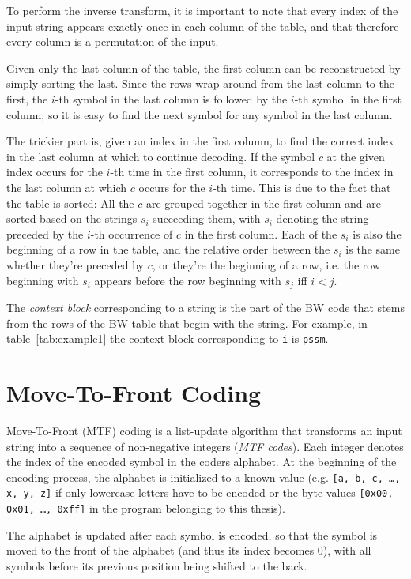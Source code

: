 \documentclass[a4paper]{scrreprt}
\begin{document}
To perform the inverse transform, it is important to note that every index of
the input string appears exactly once in each column of the table, and that
therefore every column is a permutation of the input.

Given only the last column of the table, the first column can be reconstructed
by simply sorting the last. Since the rows wrap around from the last column to
the first, the \(i\)-th symbol in the last column is followed by the \(i\)-th
symbol in the first column, so it is easy to find the next symbol for any
symbol in the last column.

The trickier part is, given an index in the first column, to find the correct
index in the last column at which to continue decoding. If the symbol \(c\)
at the given index occurs for the \(i\)-th time in the first column, it
corresponds to the index in the last column at which \(c\) occurs for the
\(i\)-th time. This is due to the fact that the table is sorted: All the \(c\)
are grouped together in the first column and are sorted based on the strings
\(s_i\) succeeding them, with \(s_i\) denoting the string preceded by the
\(i\)-th occurrence of \(c\) in the first column. Each of the \(s_i\) is also
the beginning of a row in the table, and the relative order between the \(s_i\)
is the same whether they're preceded by \(c\), or they're the beginning of a
row, i.e. the row beginning with \(s_i\) appears before the row beginning with
\(s_j\) iff \(i<j\).

The \emph{context block} corresponding to a string is the part of the BW code
that stems from the rows of the BW table that begin with the string. For
example, in table~\ref{tab:example1} the context block corresponding to
\texttt{i} is \texttt{pssm}.

\section{Move-To-Front Coding}

Move-To-Front (MTF) coding is a list-update algorithm that transforms an input
string into a sequence of non-negative integers (\emph{MTF codes}). Each integer
denotes the index of the encoded symbol in the coders alphabet. At the beginning
of the encoding process, the alphabet is initialized to a known value (e.g.
\texttt{[a, b, c, \ldots, x, y, z]} if only lowercase letters have to be
encoded or the byte values \texttt{[0x00, 0x01, \ldots, 0xff]} in the program
belonging to this thesis).

The alphabet is updated after each symbol is encoded, so that the symbol is
moved to the front of the alphabet (and thus its index becomes 0), with all
symbols before its previous position being shifted to the back.
\end{document}

